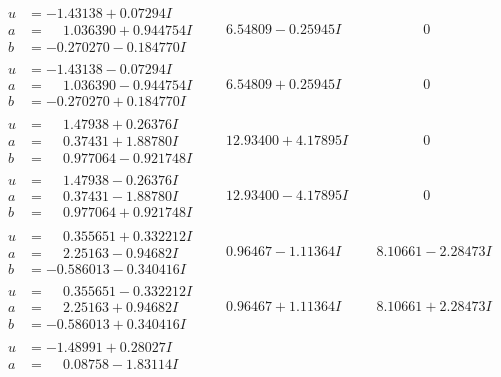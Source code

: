 \documentclass[1p]{elsarticle_modified}
\theoremstyle{definition}
\begin{document}
$$\begin{array}{c|c|c}
 \hline 
\begin{aligned}
u &= -1.43138 + 0.07294 I \\
a &= \phantom{-}1.036390 + 0.944754 I \\
b &= -0.270270 - 0.184770 I\end{aligned}
 & \phantom{-}6.54809 - 0.25945 I & \phantom{-0.000000 } 0 \\ \hline\begin{aligned}
u &= -1.43138 - 0.07294 I \\
a &= \phantom{-}1.036390 - 0.944754 I \\
b &= -0.270270 + 0.184770 I\end{aligned}
 & \phantom{-}6.54809 + 0.25945 I & \phantom{-0.000000 } 0 \\ \hline\begin{aligned}
u &= \phantom{-}1.47938 + 0.26376 I \\
a &= \phantom{-}0.37431 + 1.88780 I \\
b &= \phantom{-}0.977064 - 0.921748 I\end{aligned}
 & \phantom{-}12.93400 + 4.17895 I & \phantom{-0.000000 } 0 \\ \hline\begin{aligned}
u &= \phantom{-}1.47938 - 0.26376 I \\
a &= \phantom{-}0.37431 - 1.88780 I \\
b &= \phantom{-}0.977064 + 0.921748 I\end{aligned}
 & \phantom{-}12.93400 - 4.17895 I & \phantom{-0.000000 } 0 \\ \hline\begin{aligned}
u &= \phantom{-}0.355651 + 0.332212 I \\
a &= \phantom{-}2.25163 - 0.94682 I \\
b &= -0.586013 - 0.340416 I\end{aligned}
 & \phantom{-}0.96467 - 1.11364 I & \phantom{-}8.10661 - 2.28473 I \\ \hline\begin{aligned}
u &= \phantom{-}0.355651 - 0.332212 I \\
a &= \phantom{-}2.25163 + 0.94682 I \\
b &= -0.586013 + 0.340416 I\end{aligned}
 & \phantom{-}0.96467 + 1.11364 I & \phantom{-}8.10661 + 2.28473 I \\ \hline\begin{aligned}
u &= -1.48991 + 0.28027 I \\
a &= \phantom{-}0.08758 - 1.83114 I \\

\end{aligned}
\end{array}$$
\end{document}
